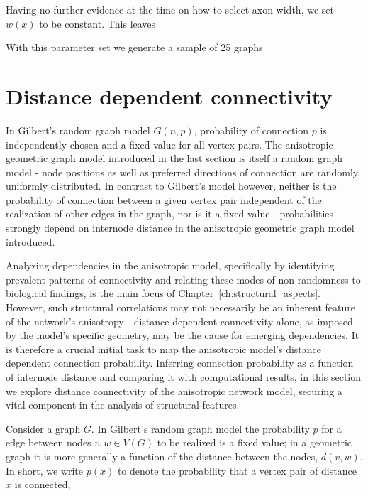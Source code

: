 Having no further evidence at the time on how to select axon width, we
set $w(x)$ to be constant. This leaves 



With this parameter set we generate a sample of 25 graphs %







\newpage
\section{Distance dependent connectivity}\label{sec:dist_depend_con}

In Gilbert's random graph model $G(n,p)$, 
probability of connection $p$ is independently chosen and a fixed
value for all vertex pairs. The anisotropic geometric graph model
introduced in the last %
section is itself a random graph model - node positions as well as
preferred directions of connection are randomly, uniformly
distributed. In contrast to Gilbert's model however, neither is the
probability of connection between a given vertex pair independent of
the realization of other edges in the graph, nor is it a fixed value -
probabilities strongly depend on internode distance in the
anisotropic geometric graph model introduced.

Analyzing dependencies in the anisotropic model, specifically by
identifying prevalent patterns of connectivity and relating these
modes of non-randomness to biological findings, is the main focus of
Chapter~\ref{ch:structural_aspects}. However, such structural
correlations may not necessarily be an inherent feature of the
network's anisotropy - distance dependent connectivity alone, as
imposed by the model's specific geometry, may be the cause for
emerging dependencies. It is therefore a crucial initial task to map
the anisotropic model's distance dependent connection
probability. Inferring connection probability as a function of
internode distance and comparing it with computational results, in
this section we explore distance connectivity of the anisotropic
network model, securing a vital component in the analysis of
structural features.

Consider a graph $G$. In Gilbert's random graph model the probability
$p$ for a edge between nodes $v,w \in V(G)$ to be realized is a fixed
value; in a geometric graph it is more generally a function of the
distance between the nodes, $d(v,w)$. In short, we write $p(x)$ to
denote the probability that a vertex pair of distance $x$ is
connected,

